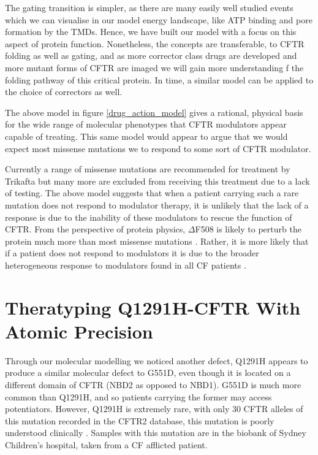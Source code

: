 The gating transition is simpler, as there are many easily well studied events which we can visualise in our model energy landscape, like ATP binding and pore formation by the TMDs. Hence, we have built our model with a focus on this aspect of protein function. Nonetheless, the concepts are transferable, to CFTR folding as well as gating, and as more corrector class drugs are developed and more mutant forms of CFTR are imaged we will gain more understanding f the folding pathway of this critical protein. In time, a similar model can be applied to the choice of correctors as well.  

The above model in figure \ref{drug_action_model} gives a rational, physical basis for the wide range of molecular phenotypes that CFTR modulators appear capable of treating. This same model would appear to argue that we would expect most missense mutations we to respond to some sort of CFTR modulator. 

Currently a range of missense mutations are recommended for treatment by Trikafta but many more are excluded from receiving this treatment due to a lack of testing. The above model suggests that when a patient carrying such a rare mutation does not respond to modulator therapy, it is unlikely that the lack of a response is due to the inability of these modulators to rescue the function of CFTR. From the perspective of protein physics, $\Delta$F508 is likely to perturb the protein much more than most missense mutations \cite{}. Rather, it is more likely that if a patient does not respond to modulators it is due to the broader heterogeneous response to modulators found in all CF patients \cite{}. 


\section{Theratyping Q1291H-CFTR With Atomic Precision}

Through our molecular modelling we noticed another defect, Q1291H appears to produce a similar molecular defect to G551D, even though it is located on a different domain of CFTR (NBD2 as opposed to NBD1). G551D is much more common than Q1291H, and so patients carrying the former may access potentiators. However, Q1291H is extremely rare, with only 30 CFTR alleles of this mutation recorded in the CFTR2 database, this mutation is poorly understood clinically \cite{cftr2}. Samples with this mutation are in the biobank of Sydney Children's hospital, taken from a CF afflicted patient. 

